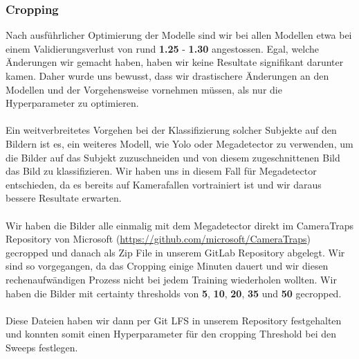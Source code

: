 \documentclass{article}
\begin{document}
\subsubsection{Cropping}
Nach ausführlicher Optimierung der Modelle sind wir bei allen Modellen etwa bei einem Validierungsverlust von rund \textbf{1.25} - \textbf{1.30} angestossen. Egal, welche Änderungen wir gemacht haben, haben wir keine Resultate signifikant darunter kamen.
Daher wurde uns bewusst, dass wir drastischere Änderungen an den Modellen und der Vorgehensweise vornehmen müssen, als nur die Hyperparameter zu optimieren.\\\\
\noindent
Ein weitverbreitetes Vorgehen bei der Klassifizierung solcher Subjekte auf den Bildern ist es, ein weiteres Modell, wie Yolo oder Megadetector zu verwenden, um die Bilder auf das Subjekt zuzuschneiden und von diesem zugeschnittenen Bild das Bild zu klassifizieren. Wir haben uns in diesem Fall für Megadetector entschieden, da es bereits auf Kamerafallen vortrainiert ist und wir daraus bessere Resultate erwarten. \\\\
\noindent
Wir haben die Bilder alle einmalig mit dem Megadetector direkt im CameraTraps Repository von Microsoft (\url{https://github.com/microsoft/CameraTraps}) gecropped und danach als Zip File in unserem GitLab Repository abgelegt. Wir sind so vorgegangen, da das Cropping einige Minuten dauert und wir diesen rechenaufwändigen Prozess nicht bei jedem Training wiederholen wollten. Wir haben die Bilder mit certainty thresholds von \textbf{5}, \textbf{10}, \textbf{20}, \textbf{35} und \textbf{50} gecropped.\\\\
\noindent
Diese Dateien haben wir dann per Git LFS in unserem Repository festgehalten und konnten somit einen Hyperparameter für den cropping Threshold bei den Sweeps festlegen.

\newpage
\end{document}
